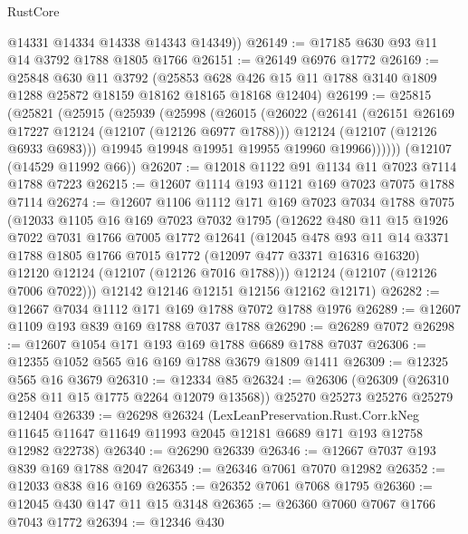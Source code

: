\begin{lexlean}{RustCore}
\begin{coremodule}
        @14331
        @14334
        @14338
        @14343
        @14349))
@26149 := @17185 @630 @93 @11 @14 @3792 @1788 @1805 @1766
@26151 := @26149 @6976 @1772
@26169 := @25848
    @630
    @11
    @3792
    (@25853 @628 @426 @15 @11 @1788 @3140 @1809 @1288 @25872 @18159 @18162 @18165 @18168 @12404)
@26199 := @25815
    (@25821
      (@25915
        (@25939
          (@25998
            (@26015
              (@26022
                (@26141
                  (@26151 @26169 @17227 @12124 (@12107 (@12126 @6977 @1788)))
                  @12124
                  (@12107 (@12126 @6933 @6983)))
                @19945
                @19948
                @19951
                @19955
                @19960
                @19966))))))
    (@12107 (@14529 @11992 @66))
@26207 := @12018 @1122 @91 @1134 @11 @7023 @7114 @1788 @7223
@26215 := @12607 @1114 @193 @1121 @169 @7023 @7075 @1788 @7114
@26274 := @12607
    @1106
    @1112
    @171
    @169
    @7023
    @7034
    @1788
    @7075
    (@12033
      @1105
      @16
      @169
      @7023
      @7032
      @1795
      (@12622
        @480
        @11
        @15
        @1926
        @7022
        @7031
        @1766
        @7005
        @1772
        @12641
        (@12045
          @478
          @93
          @11
          @14
          @3371
          @1788
          @1805
          @1766
          @7015
          @1772
          (@12097 @477 @3371 @16316 @16320)
          @12120
          @12124
          (@12107 (@12126 @7016 @1788)))
        @12124
        (@12107 (@12126 @7006 @7022)))
      @12142
      @12146
      @12151
      @12156
      @12162
      @12171)
@26282 := @12667 @7034 @1112 @171 @169 @1788 @7072 @1788 @1976
@26289 := @12607 @1109 @193 @839 @169 @1788 @7037 @1788
@26290 := @26289 @7072
@26298 := @12607 @1054 @171 @193 @169 @1788 @6689 @1788 @7037
@26306 := @12355 @1052 @565 @16 @169 @1788 @3679 @1809 @1411
@26309 := @12325 @565 @16 @3679
@26310 := @12334 @85
@26324 := @26306
    (@26309 (@26310 @258 @11 @15 @1775 @2264 @12079 @13568))
    @25270
    @25273
    @25276
    @25279
    @12404
@26339 := @26298
    @26324
    (LexLeanPreservation.Rust.Corr.kNeg
      @11645
      @11647
      @11649
      @11993
      @2045
      @12181
      @6689
      @171
      @193
      @12758
      @12982
      @22738)
@26340 := @26290 @26339
@26346 := @12667 @7037 @193 @839 @169 @1788 @2047
@26349 := @26346 @7061 @7070 @12982
@26352 := @12033 @838 @16 @169
@26355 := @26352 @7061 @7068 @1795
@26360 := @12045 @430 @147 @11 @15 @3148
@26365 := @26360 @7060 @7067 @1766 @7043 @1772
@26394 := @12346
    @430

\end{coremodule}
\end{lexlean}
